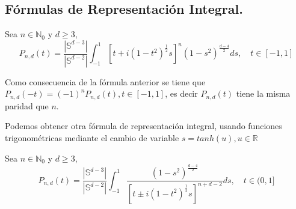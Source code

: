 \subsection{Fórmulas de Representación Integral.}
\begin{thm}Sea $n\in\mathds{N}_0$ y $d\ge3$, $$ 
	P_{n,d}(t) = \frac{|\mathds{S}^{d-3}|}{|\mathds{S}^{d-2}|}\int_{-1}^{1}[t+i(1-t^2)^{\frac{1}{2}}s]^n(1-s^2)^{\frac{d-4}{2}} ds, \quad t\in[-1,1]
	$$
\end{thm}
\begin{rem}Como consecuencia de la fórmula anterior se tiene que $P_{n,d}(-t) = (-1)^n P_{n,d}(t), t\in[-1,1]$, es decir $P_{n,d}(t)$ tiene la misma paridad que $n$.
\end{rem}
Podemos obtener otra fórmula de representación integral, usando funciones trigonométricas mediante el cambio de variable $s = tanh(u), u\in\mathds{R}$
\begin{thm}Sea $n\in\mathds{N}_0$ y $d\ge3$, $$
		P_{n,d}(t) = \frac{|\mathds{S}^{d-3}|}{|\mathds{S}^{d-2}|}\int_{-1}^{1}\frac{(1-s^2)^{\frac{d-4}{2}}}{[t\pm i(1-t^2)^{\frac{1}{2}}s]^{n+d-2}} ds, \quad t\in(0,1]
	$$
\end{thm}
